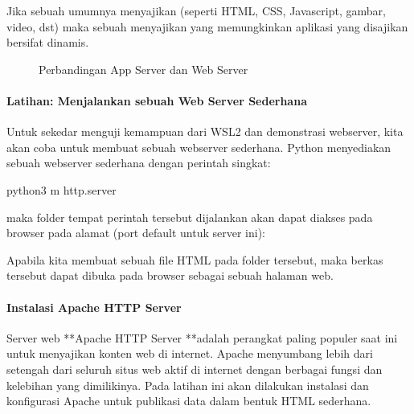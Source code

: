 \documentclass[letterpaper,10pt,english]{sphinxmanual}
\let\sphinxpxdimen\pdfpxdimen\else\newdimen\sphinxpxdimen
\begin{document}
Jika sebuah  umumnya menyajikan (seperti HTML, CSS, Javascript, gambar, video, dst) maka sebuah  menyajikan  yang memungkinkan aplikasi yang disajikan bersifat dinamis.

\begin{figure}[htbp]
\centering
\capstart

\noindent\sphinxincludegraphics[height=500\sphinxpxdimen]{{2020-12-03-03-02-24}.png}
\caption{Perbandingan App Server dan Web Server}\label{\detokenize{sesi1/linuxserver:appserver}}\end{figure}


\paragraph{Latihan: Menjalankan sebuah Web Server Sederhana}
\label{\detokenize{sesi1/linuxserver:latihan-menjalankan-sebuah-web-server-sederhana}}
Untuk sekedar menguji kemampuan  dari WSL2 dan demonstrasi webserver, kita akan coba untuk membuat sebuah webserver sederhana. Python menyediakan sebuah webserver sederhana dengan perintah singkat:

\begin{sphinxVerbatim}[commandchars=\\\{\}]
python3 \PYGZhy{}m http.server  
\end{sphinxVerbatim}

maka folder tempat perintah tersebut dijalankan akan dapat diakses pada browser pada alamat  (port default untuk server ini):


Apabila kita membuat sebuah file HTML pada folder tersebut, maka berkas tersebut dapat dibuka pada browser sebagai sebuah halaman web.


\paragraph{Instalasi Apache HTTP Server}
\label{\detokenize{sesi1/linuxserver:instalasi-apache-http-server}}
Server web **Apache HTTP Server **adalah perangkat paling populer saat ini untuk menyajikan konten web di internet. Apache menyumbang lebih dari setengah dari seluruh situs web aktif di internet dengan berbagai fungsi dan kelebihan yang dimilikinya.
Pada latihan ini akan dilakukan instalasi dan konfigurasi Apache untuk publikasi data dalam bentuk HTML sederhana.
\end{document}
